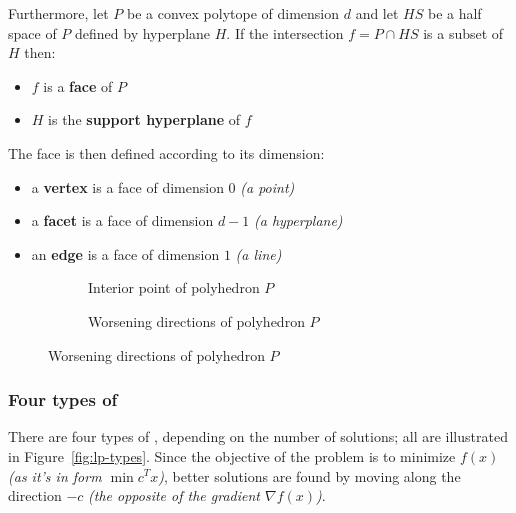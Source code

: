 \documentclass[english]{article}
\begin{document}
\bigskip
Furthermore, let \(P\) be a convex polytope of dimension \(d\) and let \(HS\) be a half space of \(P\) defined by hyperplane \(H\).
If the intersection \(f = P \cap HS\) is a subset of \(H\) then:

\begin{itemize}
  \item \(f\) is a \textbf{face} of \(P\)
  \item \(H\) is the \textbf{support hyperplane} of \(f\)
\end{itemize}

The face is then defined according to its dimension:

\begin{itemize}
  \item a \textbf{vertex} is a face of dimension \(0\) \textit{(a point)}
  \item a \textbf{facet} is a face of dimension \(d-1\) \textit{(a hyperplane)}
  \item an \textbf{edge} is a face of dimension \(1\) \textit{(a line)}
\end{itemize}

\begin{figure}[htbp]
  \bigskip
  \centering
  \begin{subfigure}[b]{0.495\textwidth}
    \bigskip
    \centering
    \caption{Interior point of polyhedron \(P\)}
    \label{subfig:interior-point-solution}
    \bigskip
  \end{subfigure}
  \begin{subfigure}[b]{0.495\textwidth}
    \bigskip
    \centering
    \caption{Worsening directions of polyhedron \(P\)}
    \label{subfig:worsening-point-direction}
    \bigskip
  \end{subfigure}
  \bigskip
\end{figure}

\subsubsection{Four types of \LP}

There are four types of \LP, depending on the number of solutions; all are illustrated in Figure~\ref{fig:lp-types}.
Since the objective of the problem is to minimize \(f(x)\) \textit{(as it's in form \(\min c^T x\))}, better solutions are found by moving along the direction \(-c\) \textit{(the opposite of the gradient \(\nabla f(x)\))}.
\end{document}
